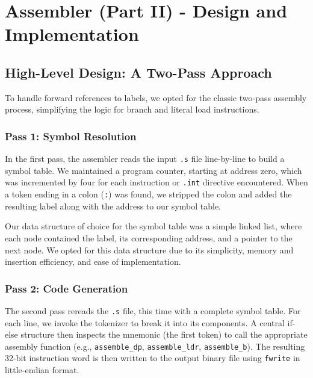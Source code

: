 \documentclass[11pt]{article}
\begin{document}
\section{Assembler (Part II) - Design and Implementation}

\subsection{High-Level Design: A Two-Pass Approach}

To handle forward references to labels, we opted for the classic two-pass assembly process, 
simplifying the logic for branch and literal load instructions.

\subsubsection{Pass 1: Symbol Resolution}
In the first pass, the assembler reads the input \texttt{.s} file line-by-line to build a symbol table. 
We maintained a program counter, starting at address zero, which was incremented by four for each instruction or \texttt{.int} 
directive encountered. When a token ending in a colon (\texttt{:}) was found, 
we stripped the colon and added the resulting label along with the address to our symbol table. 

Our data structure of choice for the symbol table was a simple linked list, where each node contained the label,
its corresponding address, and a pointer to the next node. We opted for this data structure due to its simplicity, 
memory and insertion efficiency, and ease of implementation.  


\subsubsection{Pass 2: Code Generation}
The second pass rereads the \texttt{.s} file, this time with a complete symbol table. 
For each line, we invoke the tokenizer to break it into its components. 
A central if-else structure then inspects the mnemonic (the first token) to call the appropriate assembly function 
(e.g., \texttt{assemble\_dp}, \texttt{assemble\_ldr}, \texttt{assemble\_b}). 
The resulting 32-bit instruction word is then written to the output binary file using \texttt{fwrite} in little-endian format.
\end{document}
